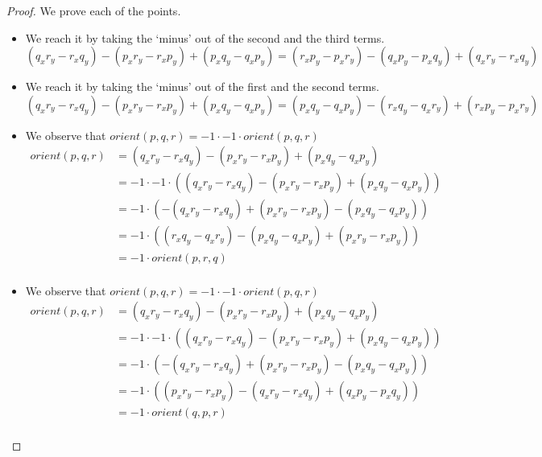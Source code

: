 \documentclass{article}
\begin{document}
\begin{proof} We prove each of the points.
    \begin{itemize}
    \item We reach it by taking the `minus' out of the second and the third terms.
    $$ (q_xr_y - r_xq_y) - (p_xr_y-r_xp_y) + (p_xq_y - q_xp_y) = (r_xp_y - p_xr_y) - (q_xp_y - p_xq_y) + (q_xr_y - r_xq_y) $$
    \item We reach it by taking the `minus' out of the first and the second terms.
    $$ (q_xr_y - r_xq_y) - (p_xr_y-r_xp_y) + (p_xq_y - q_xp_y) = (p_xq_y - q_xp_y) -(r_xq_y - q_xr_y) + (r_xp_y - p_xr_y) $$
    \item We observe that $orient(p, q, r) = -1 \cdot -1 \cdot orient(p, q, r)$ 
        \begin{equation*} 
            \begin{split}
                orient(p, q, r) & = (q_xr_y - r_xq_y) - (p_xr_y-r_xp_y) + (p_xq_y - q_xp_y) \\
                                & = -1 \cdot -1 \cdot ((q_xr_y - r_xq_y) - (p_xr_y-r_xp_y) + (p_xq_y - q_xp_y))\\
                                & = -1 \cdot (-(q_xr_y - r_xq_y) + (p_xr_y-r_xp_y) - (p_xq_y - q_xp_y))\\
                                & = -1 \cdot ((r_xq_y - q_xr_y) - (p_xq_y - q_xp_y) + (p_xr_y-r_xp_y)) \\
                                & = -1 \cdot orient(p, r, q) \\
            \end{split}
        \end{equation*}
    \item We observe that $orient(p, q, r) = -1 \cdot -1 \cdot orient(p, q, r)$ 
        \begin{equation*} 
            \begin{split}
                orient(p, q, r) & = (q_xr_y - r_xq_y) - (p_xr_y-r_xp_y) + (p_xq_y - q_xp_y) \\
                                & = -1 \cdot -1 \cdot ((q_xr_y - r_xq_y) - (p_xr_y-r_xp_y) + (p_xq_y - q_xp_y))\\
                                & = -1 \cdot (-(q_xr_y - r_xq_y) + (p_xr_y-r_xp_y) - (p_xq_y - q_xp_y))\\
                                & = -1 \cdot ((p_xr_y-r_xp_y) -(q_xr_y - r_xq_y) + (q_xp_y - p_xq_y)) \\
                                & = -1 \cdot orient(q, p, r) \\

\end{split}
\end{equation*}
\end{itemize}
\end{proof}
\end{document}

